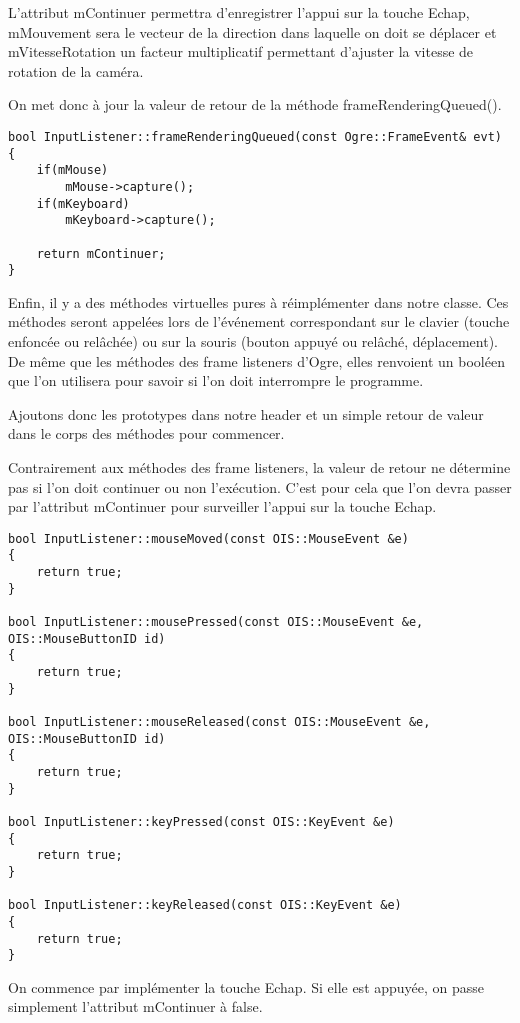 L'attribut mContinuer permettra d'enregistrer l'appui sur la touche Echap, mMouvement sera le vecteur de la direction dans laquelle on doit se d\'eplacer et mVitesseRotation un facteur multiplicatif permettant d'ajuster la vitesse de rotation de la cam\'era.

On met donc \`a jour la valeur de retour de la m\'ethode frameRenderingQueued().

\begin{lstlisting}[caption={}]
bool InputListener::frameRenderingQueued(const Ogre::FrameEvent& evt)
{
    if(mMouse)
        mMouse->capture();
    if(mKeyboard)
        mKeyboard->capture();

    return mContinuer;
}
\end{lstlisting}

Enfin, il y a des m\'ethodes virtuelles pures \`a r\'eimpl\'ementer dans notre classe. Ces m\'ethodes seront appel\'ees lors de l'\'ev\'enement correspondant sur le clavier (touche enfonc\'ee ou rel\^ach\'ee) ou sur la souris (bouton appuy\'e ou rel\^ach\'e, d\'eplacement). De m\^eme que les m\'ethodes des frame listeners d'Ogre, elles renvoient un bool\'een que l'on utilisera pour savoir si l'on doit interrompre le programme.

Ajoutons donc les prototypes dans notre header et un simple retour de valeur dans le corps des m\'ethodes pour commencer.

Contrairement aux m\'ethodes des frame listeners, la valeur de retour ne d\'etermine pas si l'on doit continuer ou non l'ex\'ecution. C'est pour cela que l'on devra passer par l'attribut mContinuer pour surveiller l'appui sur la touche Echap.


\begin{lstlisting}[caption={M\'ethodes virtuelles appel\'ees lors d'un \'ev\`enement sur un p\'eriph\'erique}]
bool InputListener::mouseMoved(const OIS::MouseEvent &e)
{
    return true;
}

bool InputListener::mousePressed(const OIS::MouseEvent &e, OIS::MouseButtonID id)
{
    return true;
}

bool InputListener::mouseReleased(const OIS::MouseEvent &e, OIS::MouseButtonID id)
{
    return true;
}

bool InputListener::keyPressed(const OIS::KeyEvent &e)
{
    return true;
}

bool InputListener::keyReleased(const OIS::KeyEvent &e)
{
    return true;
}
\end{lstlisting}

On commence par impl\'ementer la touche Echap. Si elle est appuy\'ee, on passe simplement l'attribut mContinuer \`a false.

